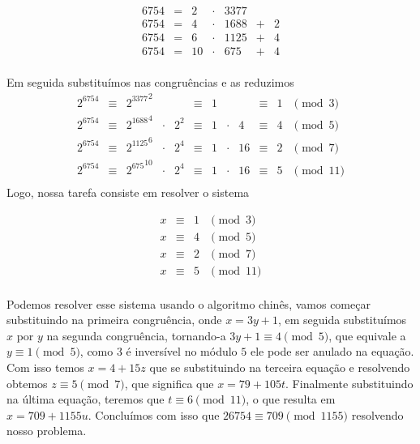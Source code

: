\[
\begin{array}{ccccccc}
6754 & = & 2 &\cdot & 3377 && \\
6754 & = & 4 &\cdot & 1688 & + & 2\\
6754 & = & 6 &\cdot & 1125 & + & 4\\
6754 & = & 10 &\cdot & 675 & + & 4\\
\end{array}
\]

Em seguida substitu\'imos nas congru\^encias e as reduzimos
\[
\begin{array}{cccccccccccc}
2^{6754} &\equiv &{2^{3377}}^{2} &			&			&\equiv	&1 &			&	 &\equiv&  1&\pmod{3}\\  
2^{6754} &\equiv &{2^{1688}}^{4} &\cdot& 	2^2 &\equiv &1 &\cdot &4 &\equiv&  4& \pmod{5}\\  
2^{6754} &\equiv &{2^{1125}}^{6} &\cdot& 	2^4 &\equiv &1 &\cdot &16&\equiv&  2& \pmod{7}\\ 
2^{6754} &\equiv &{2^{675}}^{10} &\cdot& 	2^4 &\equiv &1 &\cdot &16&\equiv&  5& \pmod{11}\\  
\end{array}
\]
Logo, nossa tarefa consiste em resolver o sistema

\[
\begin{array}{rccl}
x &\equiv& 1 &\pmod{3}\\
x &\equiv& 4 &\pmod{5}\\
x &\equiv& 2 &\pmod{7}\\
x &\equiv& 5 &\pmod{11}\\  
\end{array}
\]

Podemos resolver esse sistema usando o algoritmo chin\^es, vamos come\c{c}ar substituindo na primeira congru\^encia, onde $x = 3y + 1$, em seguida substitu\'imos $x$ por $y$ na segunda congru\^encia, tornando-a $3y + 1 \equiv 4 \pmod{5}$, que equivale a $y \equiv 1 \pmod{5}$, como $3$ \'e invers\'ivel no m\'odulo $5$ ele pode ser anulado na equa\c{c}\~ao. Com isso temos $x = 4+15z$ que se substituindo na terceira equa\c{c}\~ao e resolvendo obtemos $z \equiv 5 \pmod{7}$, que significa que $x = 79 + 105t$. Finalmente substituindo na \'ultima equa\c{c}\~ao, teremos que $t \equiv 6 \pmod{11}$, o que resulta em $x = 709+1155u$. Conclu\'imos com isso que $26754 \equiv 709 \pmod{1155}$ resolvendo nosso problema. 
